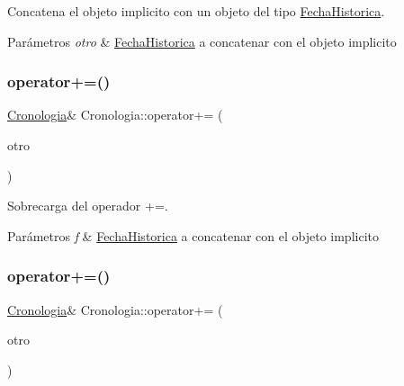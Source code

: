 Concatena el objeto implicito con un objeto del tipo \hyperlink{classFechaHistorica}{Fecha\+Historica}. 


\begin{DoxyParams}{Parámetros}
{\em otro} & \hyperlink{classFechaHistorica}{Fecha\+Historica} a concatenar con el objeto implicito \\
\hline
\end{DoxyParams}
\mbox{\label{classCronologia_a7e6b4c1621dfba75b113819a6b32e2ef}} 
\subsubsection{\texorpdfstring{operator+=()}{operator+=()}\hspace{0.1cm}{\footnotesize\ttfamily [1/2]}}
{\footnotesize\ttfamily \hyperlink{classCronologia}{Cronologia}\& Cronologia\+::operator+= (\begin{DoxyParamCaption}\item[{const \hyperlink{classFechaHistorica}{Fecha\+Historica} \&}]{otro }\end{DoxyParamCaption})}



Sobrecarga del operador +=. 


\begin{DoxyParams}{Parámetros}
{\em f} & \hyperlink{classFechaHistorica}{Fecha\+Historica} a concatenar con el objeto implicito \\
\hline
\end{DoxyParams}
\mbox{\label{classCronologia_a5eb738cdce8fd5b7239a384476ddef7f}} 
\subsubsection{\texorpdfstring{operator+=()}{operator+=()}\hspace{0.1cm}{\footnotesize\ttfamily [2/2]}}
{\footnotesize\ttfamily \hyperlink{classCronologia}{Cronologia}\& Cronologia\+::operator+= (\begin{DoxyParamCaption}\item[{const \hyperlink{classCronologia}{Cronologia} \&}]{otro }\end{DoxyParamCaption})}



